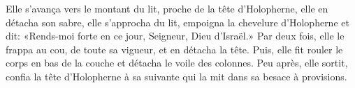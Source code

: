 Elle s’avança vers le montant du lit, proche de la tête d’Holopherne,
	elle en détacha son sabre, elle s’approcha du lit,
	empoigna la chevelure d’Holopherne et dit:
	«Rends-moi forte en ce jour, Seigneur, Dieu d’Israël.»
Par deux fois, elle le frappa au cou, de toute sa vigueur, et en détacha la tête.
Puis, elle fit rouler le corps en bas de la couche et détacha le voile des colonnes.
Peu après, elle sortit,
	confia la tête d’Holopherne à sa suivante qui la mit dans sa besace à provisions.
